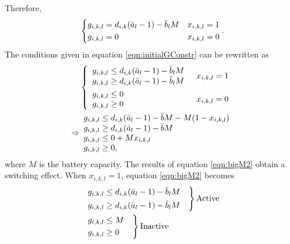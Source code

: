 Therefore, 
\begin{equation}\label{eqn:initialGConstr}
	\begin{aligned}
		\begin{dcases}
			g_{i,k,l} = d_{i,k}(\bar{a}_l - 1) - \bar{b}_lM & x_{i,k,l} = 1\\
			g_{i,k,l} = 0 & x_{i,k,l} = 0
		\end{dcases}.
	\end{aligned}
\end{equation}
The conditions given in equation \ref{eqn:initialGConstr} can be rewritten as 
\begin{equation}\label{eqn:bigM2}
\begin{aligned}
	& \begin{dcases} 
		\begin{array}{l}
		g_{i,k,l} \le d_{i,k}(\bar{a}_l - 1) - \bar{b}_lM\\
		g_{i,k,l} \ge d_{i,k}(\bar{a}_l - 1) - \bar{b}_lM\\
		\end{array}
		& x_{i,k,l} = 1 \\
		\begin{array}{l}
		g_{i,k,l} \le 0 \\
		g_{i,k,l} \ge 0 \\
		\end{array} & x_{i,k,l} = 0\\ 
	\end{dcases} \\ 
	\Rightarrow &  
	\begin{array}{l} 
		 g_{i,k,l} \le d_{i,k}(\bar{a}_l - 1) - \bar{b}M - M(1 - x_{i,k,l})\\
		 g_{i,k,l} \ge d_{i,k}(\bar{a}_l - 1) - \bar{b}M\\
		 g_{i,k,l} \le 0 + Mx_{i,k,l} \\
		 g_{i,k,l} \ge 0, \\
	\end{array}\\ 
\end{aligned}
\end{equation}
where $M$ is the battery capacity. The results of equation \ref{eqn:bigM2} obtain a switching effect.  When $x_{i,k,l} = 1$, equation \ref{eqn:bigM2} becomes 
\begin{equation}
	\begin{aligned}
		& \begin{rcases}
			g_{i,k,l} \le d_{i,k}(\bar{a}_l - 1) - \bar{b}_lM & \\
			g_{i,k,l} \ge d_{i,k}(\bar{a}_l - 1) - \bar{b}_lM & \\
		\end{rcases} \text{Active}\\ 
		& \begin{drcases}
			g_{i,k,l} \le M & \\
			g_{i,k,l} \ge 0 & \\ 
		\end{drcases} \text{Inactive} \\
	\end{aligned}
\end{equation}
